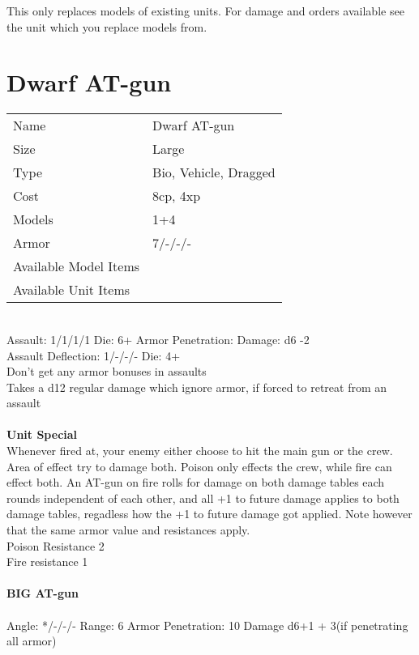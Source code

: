 This only replaces models of existing units. For damage and orders available see the unit which you replace models from.



\pagebreak

\section{ Dwarf AT-gun }

\begin{tabular}{ll}
  Name & Dwarf AT-gun \\
  Size & Large\\
  Type & Bio, Vehicle, Dragged\\
  Cost & 8cp, 4xp\\
  Models & 1+4\\
  Armor & 7/-/-/-\\
  Available Model Items &  \\
  Available Unit Items &  \\
\end{tabular}

\ \\
Assault: 1/1/1/1 Die: 6+ Armor Penetration:  Damage: d6 -2 \\
Assault Deflection: 1/-/-/- Die: 4+\\
\indent Don't get any armor bonuses in assaults\\ Takes a d12 regular damage which ignore armor, if forced to retreat from an assault \\
\ \\

{\bf Unit Special} \\
Whenever fired at, your enemy either choose to hit the main gun or the crew. Area of effect try to damage both. Poison only effects the crew, while fire can effect both. An AT-gun on fire rolls for damage on both damage tables each rounds independent of each other, and all +1 to future damage applies to both damage tables, regadless how the +1 to future damage got applied. Note however that the same armor value and resistances apply. \\ Poison Resistance 2 \\ Fire resistance 1
\ \\
\ \\
{\bf BIG AT-gun } \\
\ \\
Angle: */-/-/- Range: 6 Armor Penetration: 10 Damage d6+1 + 3(if penetrating all armor) \\
\indent  \\





